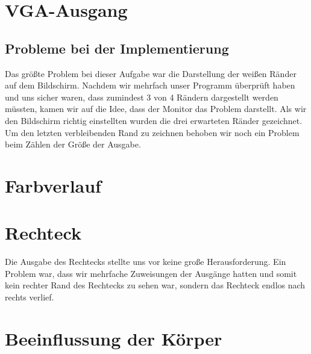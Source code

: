\documentclass[parskip=full]{scrartcl}
\begin{document}
	\setcounter{section}{0}
	\section{VGA-Ausgang}
		\subsection{Probleme bei der Implementierung}
			Das größte Problem bei dieser Aufgabe war die Darstellung der weißen Ränder auf dem Bildschirm. Nachdem wir mehrfach unser Programm überprüft haben und uns sicher waren, dass zumindest 3 von 4 Rändern dargestellt werden müssten, kamen wir auf die Idee, dass der Monitor das Problem darstellt. Als wir den Bildschirm richtig einstellten wurden die drei erwarteten Ränder gezeichnet. Um den letzten verbleibenden Rand zu zeichnen behoben wir noch ein Problem beim Zählen der Größe der Ausgabe.

	\section{Farbverlauf}
		
	\section{Rechteck}
		Die Ausgabe des Rechtecks stellte uns vor keine große Herausforderung. Ein Problem war, dass wir mehrfache Zuweisungen der Ausgänge hatten und somit kein rechter Rand des Rechtecks zu sehen war, sondern das Rechteck endlos nach rechts verlief.
	
	\section{Beeinflussung der Körper}
	
\end{document}
